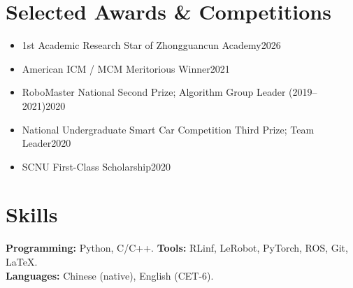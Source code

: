 \documentclass[11pt,a4paper]{article}
\begin{document}
\section*{Selected Awards \& Competitions}
\begin{itemize}
\item 1st Academic Research Star of Zhongguancun Academy\hfill 2026
\item American ICM / MCM Meritorious Winner\hfill 2021
\item RoboMaster National Second Prize; Algorithm Group Leader (2019--2021)\hfill 2020
\item National Undergraduate Smart Car Competition Third Prize; Team Leader\hfill 2020
\item SCNU First-Class Scholarship\hfill 2020
\end{itemize}

\section*{Skills}
\textbf{Programming:} Python, C/C++.\quad
\textbf{Tools:} RLinf, LeRobot, PyTorch, ROS, Git, \LaTeX.\\
\textbf{Languages:} Chinese (native), English (CET-6).
\end{document}
